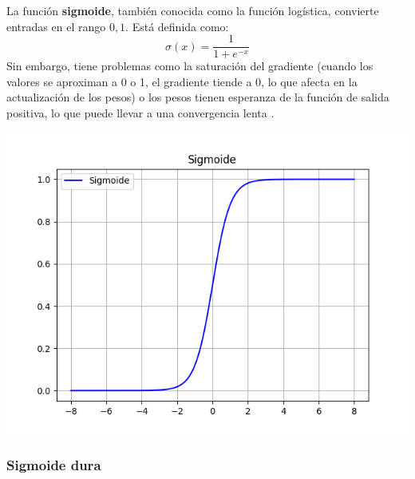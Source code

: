 \begin{minipage}{0.6\textwidth}
    La función \textbf{sigmoide}, también conocida como la función logística, convierte entradas en el rango \(0, 1\). Está definida como:
\begin{equation}
    \sigma(x) = \frac{1}{1 + e^{-x}} 
\end{equation}
Sin embargo, tiene problemas como la saturación del gradiente (cuando los valores se aproximan a 0 o 1, el gradiente tiende a 0, lo que afecta en la actualización de los pesos) o los pesos tienen esperanza de la función de salida positiva, lo que puede llevar a una convergencia lenta \citep{pajares2021aprendizaje}.
\end{minipage}
\begin{minipage}{0.05\textwidth}
\textbf{ }
\end{minipage}
\begin{minipage}{0.35\textwidth}
    \includegraphics[width=1.1\textwidth]{img/Sigmoide.png}
    \label{img: sigmoide}
\end{minipage}



\subsubsection*{Sigmoide dura}


